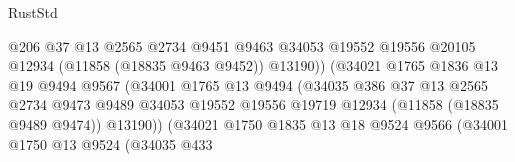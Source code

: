\begin{lexlean}{RustStd}
\begin{coremodule}
                                          @206
                                          @37
                                          @13
                                          @2565
                                          @2734
                                          @9451
                                          @9463
                                          @34053
                                          @19552
                                          @19556
                                          @20105
                                          @12934
                                          (@11858 (@18835 @9463 @9452))
                                          @13190))
                                      (@34021
                                        @1765
                                        @1836
                                        @13
                                        @19
                                        @9494
                                        @9567
                                        (@34001
                                          @1765
                                          @13
                                          @9494
                                          (@34035
                                            @386
                                            @37
                                            @13
                                            @2565
                                            @2734
                                            @9473
                                            @9489
                                            @34053
                                            @19552
                                            @19556
                                            @19719
                                            @12934
                                            (@11858 (@18835 @9489 @9474))
                                            @13190))
                                        (@34021
                                          @1750
                                          @1835
                                          @13
                                          @18
                                          @9524
                                          @9566
                                          (@34001
                                            @1750
                                            @13
                                            @9524
                                            (@34035
                                              @433

\end{coremodule}
\end{lexlean}
